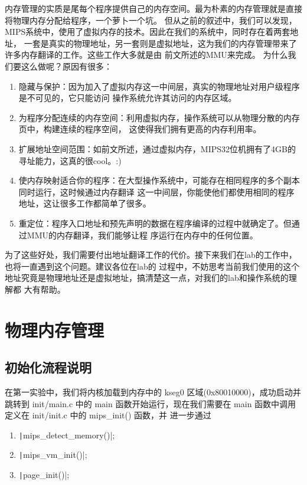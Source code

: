   内存管理的实质是尾每个程序提供自己的内存空间。最为朴素的内存管理就是直接将物理内存分配给程序，一个萝卜一个坑。
  但从之前的叙述中，我们可以发现，MIPS系统中，使用了虚拟内存的技术。因此在我们的系统中，同时存在着两套地址，
  一套是真实的物理地址，另一套则是虚拟地址，这为我们的内存管理带来了许多内存翻译的工作。这些工作大多就是由
  前文所述的MMU来完成。
  为什么我们要这么做呢？原因有很多：
    \begin{enumerate}
      \item 隐藏与保护：因为加入了虚拟内存这一中间层，真实的物理地址对用户级程序是不可见的，它只能访问
      操作系统允许其访问的内存区域。
      \item 为程序分配连续的内存空间：利用虚拟内存，操作系统可以从物理分散的内存页中，构建连续的程序空间，
      这使得我们拥有更高的内存利用率。
      \item 扩展地址空间范围：如前文所述，通过虚拟内存，MIPS32位机拥有了4GB的寻址能力，这真的很cool。:)
      \item 使内存映射适合你的程序：在大型操作系统中，可能存在相同程序的多个副本同时运行，这时候通过内存翻译
      这一中间层，你能使他们都使用相同的程序地址，这让很多工作都简单了很多。
      \item 重定位：程序入口地址和预先声明的数据在程序编译的过程中就确定了。但通过MMU的内存翻译，我们能够让程
      序运行在内存中的任何位置。
    \end{enumerate}
  为了这些好处，我们需要付出地址翻译工作的代价。接下来我们在lab的工作中，也将一直遇到这个问题。建议各位在lab的
  过程中，不妨思考当前我们使用的这个地址究竟是物理地址还是虚拟地址，搞清楚这一点，对我们的lab和操作系统的理解都
  大有帮助。

\section{物理内存管理}

\subsection{初始化流程说明}
  在第一实验中，我们将内核加载到内存中的 kseg0 区域(0x80010000)，成功启动并跳转到 init/main.c 中的
   main 函数开始运行，现在我们需要在 main 函数中调用定义在 init/init.c 中的 mips\_init() 函数，并
  进一步通过

  \begin{enumerate}
    \item \texttt|mips_detect_memory()|;
    \item \texttt|mips_vm_init()|;
    \item \texttt|page_init()|;
  \end{enumerate}

